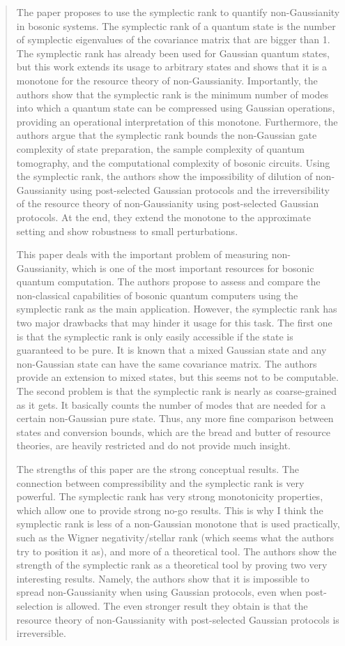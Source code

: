 \documentclass[a4paper,12pt]{article}
\newenvironment{Comment}[0]
{\noindent {\bf General Comment:} \begin{quote}}
{\end{quote}\vspace{0 cm}}
\begin{document}
\begin{Comment}
The paper proposes to use the symplectic rank to quantify non-Gaussianity in bosonic systems. The symplectic rank of a quantum state is the number of symplectic eigenvalues of the covariance matrix that are bigger than 1. The symplectic rank has already been used for Gaussian quantum states, but this work extends its usage to arbitrary states and shows that it is a monotone for the resource theory of non-Gaussianity. Importantly, the authors show that the symplectic rank is the minimum number of modes into which a quantum state can be compressed using Gaussian operations, providing an operational interpretation of this monotone. Furthermore, the authors argue that the symplectic rank bounds the non-Gaussian gate complexity of state preparation, the sample complexity of quantum tomography, and the computational complexity of bosonic circuits. Using the symplectic rank, the authors show the impossibility of dilution of non-Gaussianity using post-selected Gaussian protocols and the irreversibility of the resource theory of non-Gaussianity using post-selected Gaussian protocols. At the end, they extend the monotone to the approximate setting and show robustness to small perturbations.

This paper deals with the important problem of measuring non-Gaussianity, which is one of the most important resources for bosonic quantum computation. The authors propose to assess and compare the non-classical capabilities of bosonic quantum computers using the symplectic rank as the main application. However, the symplectic rank has two major drawbacks that may hinder it usage for this task. The first one is that the symplectic rank is only easily accessible if the state is guaranteed to be pure. It is known that a mixed Gaussian state and any non-Gaussian state can have the same covariance matrix. The authors provide an extension to mixed states, but this seems not to be computable. The second problem is that the symplectic rank is nearly as coarse-grained as it gets. It basically counts the number of modes that are needed for a certain non-Gaussian pure state. Thus, any more fine comparison between states and conversion bounds, which are the bread and butter of resource theories, are heavily restricted and do not provide much insight.

The strengths of this paper are the strong conceptual results. The connection between compressibility and the symplectic rank is very powerful. The symplectic rank has very strong monotonicity properties, which allow one to provide strong no-go results. This is why I think the symplectic rank is less of a non-Gaussian monotone that is used practically, such as the Wigner negativity/stellar rank (which seems what the authors try to position it as), and more of a theoretical tool. The authors show the strength of the symplectic rank as a theoretical tool by proving two very interesting results. Namely, the authors show that it is impossible to spread non-Gaussianity when using Gaussian protocols, even when post-selection is allowed. The even stronger result they obtain is that the resource theory of non-Gaussianity with post-selected Gaussian protocols is irreversible.


\end{Comment}
\end{document}
